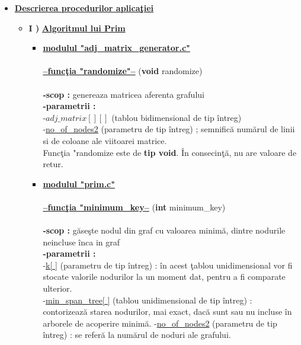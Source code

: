 \documentclass[14pt]{article}
\begin{document}
\begin{itemize}
    \item
  \underline{\Large\textbf{Descrierea procedurilor aplica\c tiei}}
    \vspace{1mm}
    \begin{itemize}
        \item \textbf{I )} \textbf{\underline{Algoritmul lui Prim}}
        \vspace{1mm}
      \begin{itemize}
           \item\underline{\textbf{modulul "adj\_matrix\_generator.c"}} \\
           \\
           \underline{\textbf{--func\c tia "randomize"--}} (\textbf{void} randomize)\\
           \\
           \textbf{-scop :} genereaza matricea aferenta grafului\\
           \textbf{-parametrii :}\\
                -\underline{$adj\_matrix[ ][ ]$} (tablou bidimensional de tip \^intreg)\\
                -\underline{no\_of\_nodes2} (parametru de tip \^intreg) ; semnific\u{a} num\u{a}rul de linii si de coloane ale viitoarei matrice.\\
           Func\c tia "randomize este de \textbf{tip void}. \^In consecin\c t\u{a}, nu are valoare de retur.
           \\
           \item \underline{\textbf{modulul "prim.c"}}\\
           \\
           \underline{\textbf{--func\c tia "minimum\_key--}} (\textbf{int} minimum\_key)\\
           \\
           \textbf{-scop :} g\u{a}se\c ste nodul din graf cu valoarea minim\u{a}, dintre nodurile neincluse \^inca in graf\\
            \textbf{-parametrii :}\\
            -\underline{k[ ]} (parametru de tip \^intreg) : \^in acest \c tablou unidimensional vor fi stocate valorile nodurilor la un moment dat, pentru a fi comparate ulterior.\\
            -\underline{min\_span\_tree[ ]} (tablou unidimensional de tip \^intreg) : contorizeaz\u{a} starea nodurilor, mai exact, dac\u{a} sunt sau nu incluse \^in arborele de acoperire minim\u{a}.
           -\underline{no\_of\_nodes2} (parametru de tip \^intreg) : se refer\u{a} la num\u{a}rul de noduri ale grafului.\\

\end{itemize}
\end{itemize}
\end{itemize}
\end{document}
